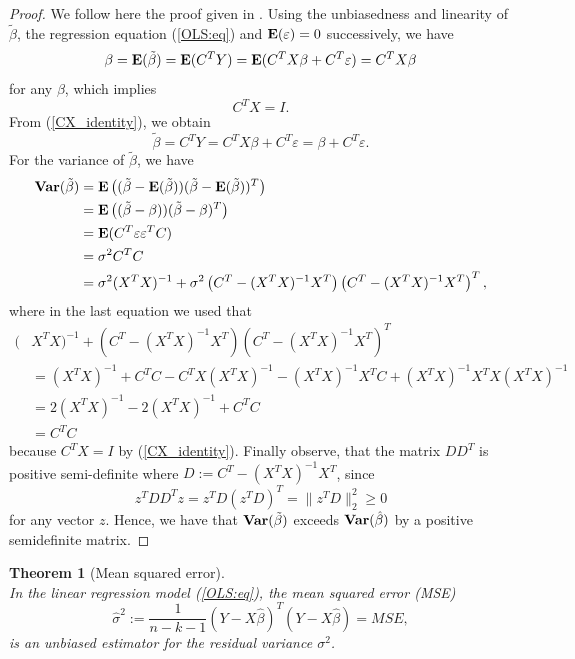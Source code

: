 \documentclass[a4paper, 11pt]{scrreprt}
\newtheorem{Theorem}{Theorem}[chapter]
\newcommand{\ew}{\mbox{\textbf{E}}}
\newcommand{\var}{\mbox{\textbf{Var}}}
\newcommand{\norm}{\|}
\begin{document}
\begin{proof} We follow here the proof given in \textcite[theorem 1.2.1]{ameniya1985advance}.
Using the unbiasedness and linearity of $\tilde{\beta}$, the regression equation (\ref{OLS:eq}) and $\ew(\varepsilon) = 0$ successively, we have
\begin{equation}
\beta = \ew(\tilde{\beta}) = \ew(C^T Y) = \ew(C^T X \beta + C^T \varepsilon ) = C^T X \beta
\end{equation}
for any $\beta$, which implies
\begin{equation}\label{CX_identity}
C^T X = I.
\end{equation}
From (\ref{CX_identity}), we obtain
\begin{equation}\label{beta_tilde}
\tilde{\beta} = C^T Y = C^T X \beta + C^T \varepsilon = \beta + C^T \varepsilon.
\end{equation}
For the variance of $\tilde{\beta}$, we have
\begin{align*}
\var(\tilde{\beta}) &= \ew\left(  (\tilde{\beta} - \ew(\tilde{\beta}))(\tilde{\beta} - \ew(\tilde{\beta}))^T  \right)  \\
&= \ew\left(  (\tilde{\beta} - \beta))(\tilde{\beta} - \beta)^T  \right) \\
&= \ew(C^T \varepsilon \varepsilon^T C) \\ 
&= \sigma^2 C^T C \\
&= \sigma^2 (X^T X)^{-1} + \sigma^2 \left( C^T - (X^T X)^{-1} X^T \right) \left( C^T - (X^T X)^{-1} X^T \right)^T,
\end{align*}
where in the last equation we used that 
\begin{align*}
(&X^T X)^{-1} + \left( C^T - (X^T X)^{-1} X^T \right) \left( C^T - (X^T X)^{-1} X^T \right)^T \\ 
&= (X^T X)^{-1} + C^T C - C^T X(X^T X)^{-1} - (X^T X)^{-1} X^T C + (X^T X)^{-1} X^T X (X^T X)^{-1} \\
&= 2(X^T X)^{-1} - 2(X^T X)^{-1}  +  C^T C \\
&= C^T C
\end{align*}
because $C^T X = I$ by (\ref{CX_identity}).
Finally observe, that the matrix $DD^T$ is positive semi-definite where $D:=  C^T - (X^T X)^{-1} X^T$, since 
\[ z^T D D^T z = z^T D (z^T D)^T = \norm z^T D \norm_2^2 \geq 0 \]
for any vector $z$. Hence, we have that $\var(\tilde{\beta})$ exceeds $\var(\hat{\beta})$ by a positive semidefinite matrix.
\end{proof}

\begin{Theorem}[Mean squared error] \label{MSE} $\text{ }$ \\ \upshape
In the linear regression model (\ref{OLS:eq}), the mean squared error (MSE) 
\begin{equation}\label{sigmahat}
\hat{\sigma}^2 := \frac{1}{n-k-1} (Y-X \hat{\beta})^T (Y-X\hat{\beta}) = MSE,
\end{equation}
is an unbiased estimator for the residual variance $\sigma^2$.
\end{Theorem}
\end{document}
